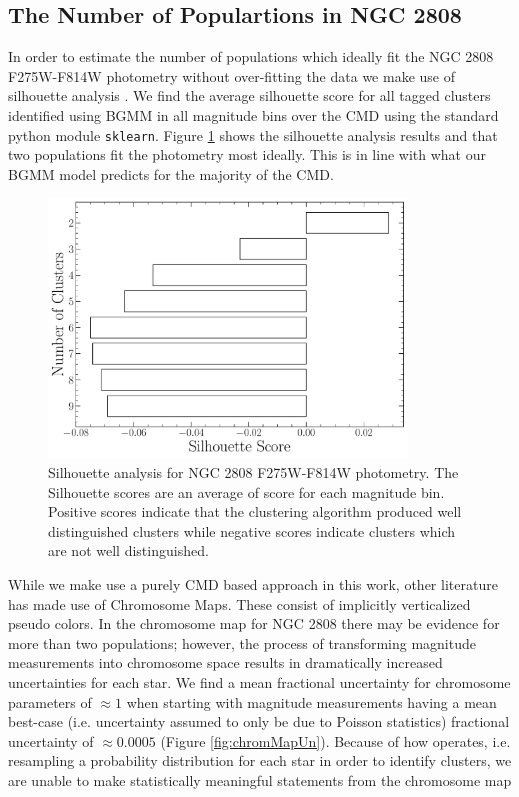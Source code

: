 \subsection{The Number of Populartions in NGC 2808}
In order to estimate the number of populations which ideally fit the NGC 2808
F275W-F814W photometry without over-fitting the data we make use of silhouette
analysis \citep[][and in a similar manner to how \citet{Valle2022} preform
their analysis of spectroscopic data]{ROUSSEEUW198753}. We find the average
silhouette score for all tagged clusters identified using BGMM in all magnitude
bins over the CMD using the standard python module \texttt{sklearn}. Figure
\ref{fig:clusterAn} shows the silhouette analysis results and that two
populations fit the photometry most ideally. This is in line with what our BGMM
model predicts for the majority of the CMD.

\begin{figure}
  \centering
  \includegraphics[width=0.85\textwidth]{figures/ngc2808/ClusterAnalysis.pdf}
  \caption{Silhouette analysis for NGC 2808 F275W-F814W photometry. The
  Silhouette scores are an average of score for each magnitude bin. Positive
  scores indicate that the clustering algorithm produced well distinguished
  clusters while negative scores indicate clusters which are not well
  distinguished.}
  \label{fig:clusterAn}
\end{figure}

While we make use a purely CMD based approach in this work, other literature
has made use of Chromosome Maps. These consist of implicitly verticalized
pseudo colors. In the chromosome map for NGC 2808 there may be evidence for
more than two populations; however, the process of transforming magnitude
measurements into chromosome space results in dramatically increased
uncertainties for each star. We find a mean fractional uncertainty for
chromosome parameters of $\approx1$ when starting with magnitude measurements
having a mean best-case (i.e. uncertainty assumed to only be due to Poisson
statistics) fractional uncertainty of $\approx 0.0005$ (Figure
\ref{fig:chromMapUn}). Because of how \fidanka operates, i.e. resampling a
probability distribution for each star in order to identify clusters, we are
unable to make statistically meaningful statements from the chromosome map


